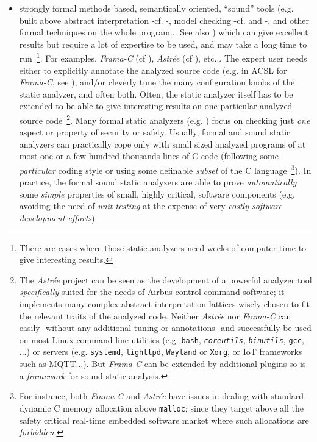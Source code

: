 \begin{itemize}
  \item strongly formal methods based, semantically oriented,
    ``sound'' tools (e.g. built above abstract interpretation -cf.
    \cite{Cousot:2014:AIP,CousotCousot77-1}-, model checking -cf.
    \cite{Schlich:2010:MCS} and \cite{Jhala:2009:SMC}-, and other
    formal techniques on the whole program... See also
    \cite{Andreasen:2017:SAI}) which can give excellent results but
    require a lot of expertise to be used, and may take a long time to
    run~\footnote{There are cases where those static analyzers need
      weeks of computer time to give interesting results.}. For
    examples, \emph{Frama-C} (cf \cite{Cuoq:2012:Frama-C}),
    \emph{Astrée} (cf \cite{Mine:2015:TIU}), etc... The expert user
    needs either to explicitly annotate the analyzed source code
    (e.g. in ACSL for \emph{Frama-C}, see \cite{Baudin:2018:ACSL,
      Delahaye:2013:CSL, Amin:2017:LAW}), and/or cleverly tune the
    many configuration knobs of the static analyzer, and often
    both. Often, the static analyzer itself has to be extended to be
    able to give interesting results on one particular analyzed source
    code~\footnote{The \emph{Astrée} project can be seen as the
      development of a powerful analyzer tool \emph{specifically}
      suited for the needs of Airbus control command software; it
      implements many complex abstract interpretation lattices wisely
      chosen to fit the relevant traits of the analyzed code. Neither
      \emph{Astrée} nor \emph{Frama-C} can easily -without any
      additional tuning or annotations- and successfully be used on
      most Linux command line utilities (e.g. \texttt{bash},
      \texttt{\emph{coreutils}}, \texttt{\emph{binutils}},
      \texttt{gcc}, ...)  or servers (e.g. \texttt{systemd},
      \texttt{lighttpd}, \texttt{Wayland} or \texttt{Xorg}, or IoT
      frameworks such as MQTT...). But \emph{Frama-C} can be extended
      by additional plugins so is a \emph{framework} for sound static
      analysis.}. Many formal static analyzers
    (e.g. \cite{Greenaway:2014:DSS, Vedala:2012:ADP}) focus on
    checking just \emph{one} aspect or property of security or
    safety. Usually, formal and sound static analyzers can practically
    cope only with small sized analyzed programs of at most one or a
    few hundred thousands lines of C code (following some
    \emph{particular} coding style or using some definable
    \emph{subset} of the C language~\footnote{For instance, both
      \emph{Frama-C} and \emph{Astrée} have issues in dealing with
      standard dynamic C memory allocation above \texttt{malloc};
      since they target above all the safety critical real-time
      embedded software market where such allocations are
      \emph{forbidden}.}).  In practice, the formal sound static
    analyzers are able to prove \emph{automatically} some
    \emph{simple} properties of small, highly critical, software
    components (e.g. avoiding the need of \emph{unit testing} at the
    expense of very \emph{costly software development efforts}).


\end{itemize}
